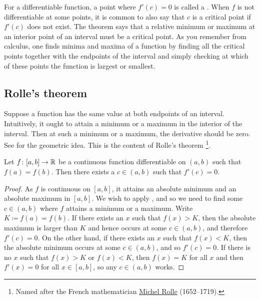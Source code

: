 For a differentiable function, a point where 
$f'(c) = 0$ is called a \emph{}.  When $f$ is not
differentiable at some points,
it is common to also say that $c$ is a critical point
if $f'(c)$ does not exist.
The theorem says that a relative minimum or maximum at an interior point
of an interval must be a critical point.
As you remember from calculus, one finds minima and maxima of a function
by finding all the critical points together with the endpoints of
the interval and simply checking at which of these points
the function is largest or smallest.

\subsection{Rolle's theorem}

Suppose a function has the same value at both endpoints of an interval.
Intuitively, it ought to attain a minimum or a maximum in the interior of the
interval.
Then at such a minimum or a maximum, the derivative should be zero.
See  for the geometric idea.
This is the content of Rolle's theorem%
\footnote{Named after the French mathematician
\href{https://en.wikipedia.org/wiki/Michel_Rolle}{Michel Rolle}
(1652--1719).}.

\begin{myfigureht}
\caption{Point where the tangent line is horizontal, that is $f'(c) =
0$.\label{rollefig}}
\end{myfigureht}

\begin{thm}[Rolle] \label{thm:rolle}
Let $f \colon [a,b] \to {\mathbb{R}}$ be a continuous function
differentiable on $(a,b)$ such that $f(a) = f(b)$.
Then there exists a $c \in (a,b)$ such that $f'(c) = 0$.
\end{thm}

\begin{proof}
As $f$ is continuous on $[a,b]$, it attains an absolute minimum and an
absolute 
maximum in $[a,b]$.  We wish to apply , and
so we need to find some $c \in (a,b)$ where $f$ attains a minimum or a
maximum.
Write $K \coloneqq f(a) = f(b)$.
If there exists an $x$ such that $f(x) > K$, then the absolute
maximum is larger than $K$ and hence occurs at some $c \in (a,b)$, and
therefore $f'(c) = 0$.  On the other hand, if there exists an $x$
such that $f(x) < K$, then the absolute minimum occurs at some
$c \in (a,b)$, and so $f'(c) = 0$.  If there is no $x$ such that
$f(x) > K$ or
$f(x) < K$, then $f(x) = K$ for all $x$ and then
$f'(x) = 0$ for all $x \in [a,b]$, so any $c \in (a,b)$ works.
\end{proof}

